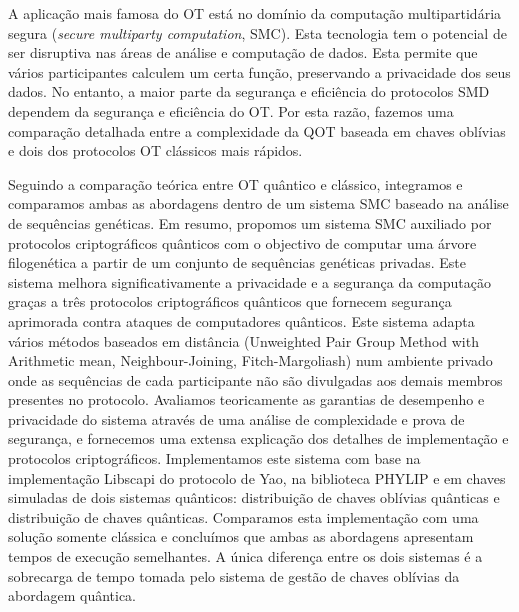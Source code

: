 A aplicação mais famosa do OT está no domínio da computação multipartidária segura (\textit{secure multiparty computation}, SMC). Esta tecnologia tem o potencial de ser disruptiva nas áreas de análise e computação de dados. Esta permite que vários participantes calculem um certa função, preservando a privacidade dos seus dados. No entanto, a maior parte da segurança e eficiência do protocolos SMD dependem da segurança e eficiência do OT. Por esta razão, fazemos uma comparação detalhada entre a complexidade da QOT baseada em chaves oblívias e dois dos protocolos OT clássicos mais rápidos.

Seguindo a comparação teórica entre OT quântico e clássico, integramos e comparamos ambas as abordagens dentro de um sistema SMC baseado na análise de sequências genéticas. Em resumo, propomos um sistema SMC auxiliado por protocolos criptográficos quânticos com o objectivo de computar uma árvore filogenética a partir de um conjunto de sequências genéticas privadas. Este sistema melhora significativamente a privacidade e a segurança da computação graças a três protocolos criptográficos quânticos que fornecem segurança aprimorada contra ataques de computadores quânticos. Este sistema adapta vários métodos baseados em distância (Unweighted Pair Group Method with Arithmetic mean, Neighbour-Joining, Fitch-Margoliash) num ambiente privado onde as sequências de cada participante não são divulgadas aos demais membros presentes no protocolo. Avaliamos teoricamente as garantias de desempenho e privacidade do sistema através de uma análise de complexidade e prova de segurança, e fornecemos uma extensa explicação dos detalhes de implementação e protocolos criptográficos. Implementamos este sistema com base na implementação Libscapi do protocolo de Yao, na biblioteca PHYLIP e em chaves simuladas de dois sistemas quânticos: distribuição de chaves oblívias quânticas e distribuição de chaves quânticas. Comparamos esta implementação com uma solução somente clássica e concluímos que ambas as abordagens apresentam tempos de execução semelhantes. A única diferença entre os dois sistemas é a sobrecarga de tempo tomada pelo sistema de gestão de chaves oblívias da abordagem quântica.

